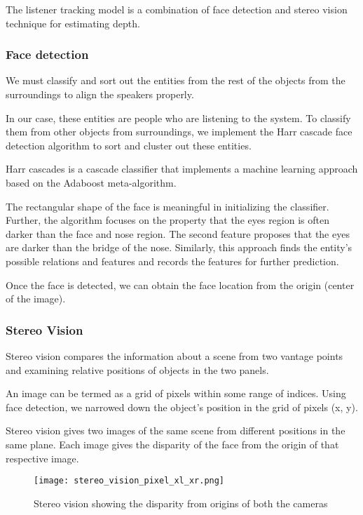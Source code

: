 \documentclass[../../hardware_design_intro/hardware_design_intro.tex]{subfiles}
\begin{document}
    
The listener tracking model is a combination of face detection and stereo vision 
technique for estimating depth.

\subsubsection{Face detection}

We must classify and sort out the entities from the rest of the objects from the 
surroundings to align the speakers properly.

In our case, these entities are people who are listening to the system. To classify 
them from other objects from surroundings, we implement the Harr cascade face detection 
algorithm to sort and cluster out these entities.

Harr cascades is a cascade classifier that implements a machine learning approach based 
on the Adaboost meta-algorithm.

The rectangular shape of the face is meaningful in initializing the classifier. Further, 
the algorithm focuses on the property that the eyes region is often darker than the face 
and nose region. The second feature proposes that the eyes are darker than the bridge of 
the nose. Similarly, this approach finds the entity's possible relations and features 
and records the features for further prediction. 

Once the face is detected, we can obtain the face location from the origin (center of 
the image).

\subsubsection{Stereo Vision}

Stereo vision compares the information about a scene from two vantage points and 
examining relative positions of objects in the two panels.

An image can be termed as a grid of pixels within some range of indices. Using face 
detection, we narrowed down the object's position in the grid of pixels (x, y). 

Stereo vision gives two images of the same scene from different positions in the same 
plane. Each image gives the disparity of the face from the origin of that respective 
image.

\begin{figure*}
    \centering
    \texttt{[image: stereo\_vision\_pixel\_xl\_xr.png]}
    \caption{Stereo vision showing the disparity from origins of both the cameras}
\end{figure*}
\end{document}
